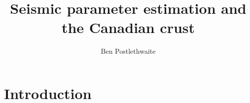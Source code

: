 \documentclass[draft, 12pt]{article}
\title{Seismic parameter estimation and the Canadian crust}
\author{Ben Postlethwaite}
\begin{document}
\begin{abstract}

\end{abstract}

\section{Introduction}


\end{document}
